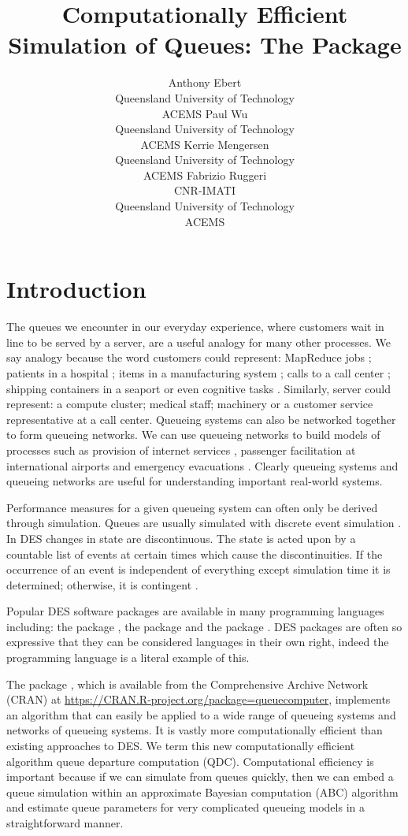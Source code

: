 \documentclass[article]{jss}
\author{Anthony  Ebert\\Queensland University of Technology\\ACEMS \And 
        Paul Wu\\Queensland University of Technology\\ACEMS \AND
        Kerrie Mengersen\\Queensland University of Technology\\ACEMS \And
        Fabrizio Ruggeri\\CNR-IMATI\\Queensland University of Technology\\ACEMS}
\title{Computationally Efficient Simulation of Queues: The \proglang{R} Package \pkg{queuecomputer}}
\begin{document}
\section{Introduction}

The queues we encounter in our everyday experience, where customers
wait in line to be served by a server, are a useful analogy for many
other processes. We say analogy because the word customers could
represent: MapReduce jobs \citep{lin_joint_2013}; patients in a
hospital \citep{takagi_queueing_2016}; items in a manufacturing system
\citep{dallery_manufacturing_1992}; calls to a call center
\citep{gans_telephone_2003}; shipping containers in a seaport
\citep{kozan_comparison_1997} or even cognitive tasks
\citep{cao_queueing_2013}. Similarly, server could represent: a
compute cluster; medical staff; machinery or a customer service
representative at a call center. Queueing systems can also be
networked together to form queueing networks. We can use queueing
networks to build models of processes such as provision of internet
services \citep{sutton_bayesian_2011}, passenger facilitation at
international airports \citep{wu_review_2013} and emergency
evacuations \citep{van_woensel_modeling_2007}. Clearly queueing
systems and queueing networks are useful for understanding important
real-world systems.

Performance measures for a given queueing system can often only be
derived through simulation. Queues are usually simulated with discrete
event simulation \citep[DES;][p.~226]{insua2012bayesian}. In DES
changes in state are discontinuous. The state is acted upon by a
countable list of events at certain times which cause the
discontinuities. If the occurrence of an event is independent of
everything except simulation time it is determined; otherwise, it is
contingent \citep{nance1981time}.

Popular DES software packages are available in many programming
languages including: the  \citep{Rproglang} package
 \citep{Rpkg_simmer}, the 
\citep{van2011python} package  \citep{Ppkg_simpy} and the
 \citep{gosling2000java} package 
\citep{Jpkg_JMT}. DES packages are often so expressive that they can
be considered languages in their own right, indeed the programming
language  \citep{dahl1966simula} is a literal example
of this.

The  package 
\citep{Rpkg_queuecomputer}, which is available from the Comprehensive
 Archive Network (CRAN) at
\url{https://CRAN.R-project.org/package=queuecomputer}, implements an
algorithm that can easily be applied to a wide range of queueing
systems and networks of queueing systems. It is vastly more
computationally efficient than existing approaches to DES. We term
this new computationally efficient algorithm queue departure
computation (QDC). Computational efficiency is important because if we
can simulate from queues quickly, then we can embed a queue simulation
within an approximate Bayesian computation (ABC) algorithm
\citep{sunnaker_approximate_2013} and estimate queue parameters for
very complicated queueing models in a straightforward manner.
\end{document}
